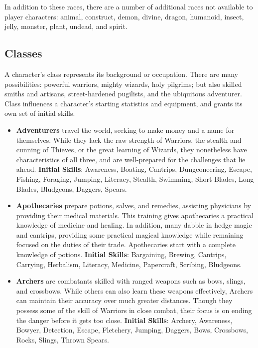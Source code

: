 In addition to these races, there are a number of additional races not
available to player characters: animal, construct, demon, divine, dragon,
humanoid, insect, jelly, monster, plant, undead, and spirit.

\subsection{Classes}

A character's class represents its background or occupation.  There are
many possibilities: powerful warriors, mighty wizards, holy pilgrims; but
also skilled smiths and artisans, street-hardened pugilists, and the
ubiquitous adventurer.  Class influences a character's starting statistics
and equipment, and grants its own set of initial skills.

\begin{itemize}
\item {\bf Adventurers} travel the world, seeking to make money and a name 
for themselves.  While they lack the raw strength of Warriors, the stealth 
and cunning of Thieves, or the great learning of Wizards, they nonetheless 
have characteristics of all three, and are well-prepared for the challenges
that lie ahead.  \textbf{Initial Skills}: Awareness, Boating, 
Cantrips, Dungeoneering, Escape, Fishing, Foraging, Jumping, Literacy, 
Stealth, Swimming, Short Blades, Long Blades, Bludgeons, Daggers, 
Spears.

\item {\bf Apothecaries} prepare potions, salves, and remedies, assisting 
physicians by providing their medical materials.  This training gives 
apothecaries a practical knowledge of medicine and healing.  In addition, 
many dabble in hedge magic and cantrips, providing some practical magical 
knowledge while remaining focused on the duties of their trade.
Apothecaries start with a complete knowledge of potions.
\textbf{Initial Skills}: Bargaining, Brewing, Cantrips, Carrying,
Herbalism, Literacy, Medicine, Papercraft, Scribing, Bludgeons.

\item {\bf Archers} are combatants skilled with ranged weapons such as 
bows, slings, and crossbows.  While others can also learn these weapons 
effectively, Archers can maintain their accuracy over much greater 
distances.  Though they possess some of the skill of Warriors in close 
combat, their focus is on ending the danger before it gets too close.  
\textbf{Initial Skills}: Archery, Awareness, Bowyer, Detection, Escape,
Fletchery, Jumping, Daggers, Bows, Crossbows, Rocks, Slings,
Thrown Spears.


\end{itemize}
